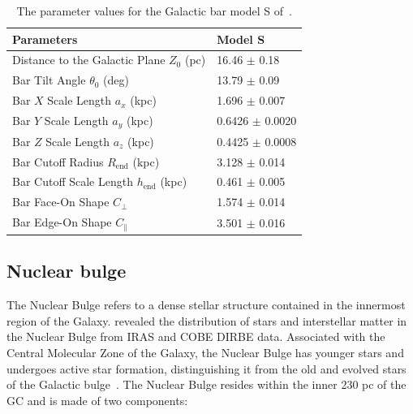 \documentclass[doublespace,nopageskip]{VTthesis} %
\begin{document}
\begin{table}[htb]
\centering
\caption{ The parameter values for the Galactic bar model S of~\citet{1998ApJ...492..495F}.}
    \begin{tabular}{ll}
    \toprule
      Parameters & Model S \\ 
      \midrule
      Distance to the Galactic Plane $Z_0$ (pc) & 16.46 $\pm$ 0.18\\
      Bar Tilt Angle $\theta_0$ (deg) & 13.79 $\pm$ 0.09\\
      Bar $X$ Scale Length $a_x$ (kpc) & 1.696 $\pm$ 0.007 \\
      Bar $Y$ Scale Length $a_y$ (kpc) & 0.6426 $\pm$ 0.0020 \\
      Bar $Z$ Scale Length $a_z$ (kpc) & 0.4425 $\pm$ 0.0008 \\
      Bar Cutoff Radius $R_{\text{end}}$ (kpc) & 3.128 $\pm$ 0.014 \\
      Bar Cutoff Scale Length $h_{\text{end}}$ (kpc) & 0.461 $\pm$ 0.005 \\
      Bar Face-On Shape $C_\perp$ & 1.574 $\pm$ 0.014 \\
      Bar Edge-On Shape $C_\parallel$ & 3.501 $\pm$ 0.016\\
      \bottomrule
    \end{tabular}
\label{tab:modelS}
\end{table}

\subsection{Nuclear bulge}\label{sec:nb}

The Nuclear Bulge refers to a dense stellar structure contained in the innermost region of the Galaxy. \citet{2002A&A...384..112L} revealed the distribution of stars and interstellar matter in the Nuclear Bulge from IRAS and COBE DIRBE data. Associated with the Central Molecular Zone of the Galaxy, the Nuclear Bulge has younger stars and undergoes active star formation, distinguishing it from the old and evolved stars of the Galactic bulge~\cite{2002A&A...384..112L}. 
The Nuclear Bulge resides within the inner 230 pc of the GC and is made of two components:
\end{document}
